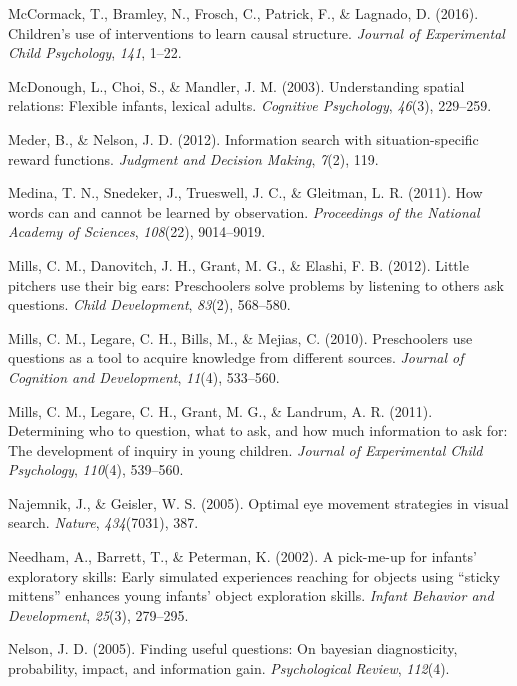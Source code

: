 \documentclass[english,floatsintext,man]{apa6}
\theoremstyle{definition}
\theoremstyle{definition}
\theoremstyle{definition}
\theoremstyle{remark}
\begin{document}
\hypertarget{ref-mccormack2016children}{}
McCormack, T., Bramley, N., Frosch, C., Patrick, F., \& Lagnado, D.
(2016). Children's use of interventions to learn causal structure.
\emph{Journal of Experimental Child Psychology}, \emph{141}, 1--22.

\hypertarget{ref-mcdonough2003understanding}{}
McDonough, L., Choi, S., \& Mandler, J. M. (2003). Understanding spatial
relations: Flexible infants, lexical adults. \emph{Cognitive
Psychology}, \emph{46}(3), 229--259.

\hypertarget{ref-meder2012information}{}
Meder, B., \& Nelson, J. D. (2012). Information search with
situation-specific reward functions. \emph{Judgment and Decision
Making}, \emph{7}(2), 119.

\hypertarget{ref-medina2011words}{}
Medina, T. N., Snedeker, J., Trueswell, J. C., \& Gleitman, L. R.
(2011). How words can and cannot be learned by observation.
\emph{Proceedings of the National Academy of Sciences}, \emph{108}(22),
9014--9019.

\hypertarget{ref-mills2012little}{}
Mills, C. M., Danovitch, J. H., Grant, M. G., \& Elashi, F. B. (2012).
Little pitchers use their big ears: Preschoolers solve problems by
listening to others ask questions. \emph{Child Development},
\emph{83}(2), 568--580.

\hypertarget{ref-mills2010preschoolers}{}
Mills, C. M., Legare, C. H., Bills, M., \& Mejias, C. (2010).
Preschoolers use questions as a tool to acquire knowledge from different
sources. \emph{Journal of Cognition and Development}, \emph{11}(4),
533--560.

\hypertarget{ref-mills2011determining}{}
Mills, C. M., Legare, C. H., Grant, M. G., \& Landrum, A. R. (2011).
Determining who to question, what to ask, and how much information to
ask for: The development of inquiry in young children. \emph{Journal of
Experimental Child Psychology}, \emph{110}(4), 539--560.

\hypertarget{ref-najemnik2005optimal}{}
Najemnik, J., \& Geisler, W. S. (2005). Optimal eye movement strategies
in visual search. \emph{Nature}, \emph{434}(7031), 387.

\hypertarget{ref-needham2002pick}{}
Needham, A., Barrett, T., \& Peterman, K. (2002). A pick-me-up for
infants' exploratory skills: Early simulated experiences reaching for
objects using ``sticky mittens'' enhances young infants' object
exploration skills. \emph{Infant Behavior and Development},
\emph{25}(3), 279--295.

\hypertarget{ref-nelson2005finding}{}
Nelson, J. D. (2005). Finding useful questions: On bayesian
diagnosticity, probability, impact, and information gain.
\emph{Psychological Review}, \emph{112}(4).
\end{document}
